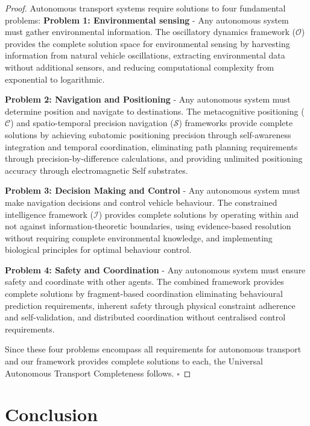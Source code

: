 \documentclass[12pt,a4paper]{article}
\begin{document}
\begin{proof}
Autonomous transport systems require solutions to four fundamental problems:
\textbf{Problem 1: Environmental sensing} - Any autonomous system must gather environmental information. The oscillatory dynamics framework ($\mathcal{O}$) provides the complete solution space for environmental sensing by harvesting information from natural vehicle oscillations, extracting environmental data without additional sensors, and reducing computational complexity from exponential to logarithmic.

\textbf{Problem 2: Navigation and Positioning} - Any autonomous system must determine position and navigate to destinations. The metacognitive positioning ($\mathcal{C}$) and spatio-temporal precision navigation ($\mathcal{S}$) frameworks provide complete solutions by achieving subatomic positioning precision through self-awareness integration and temporal coordination, eliminating path planning requirements through precision-by-difference calculations, and providing unlimited positioning accuracy through electromagnetic Self substrates.

\textbf{Problem 3: Decision Making and Control} - Any autonomous system must make navigation decisions and control vehicle behaviour. The constrained intelligence framework ($\mathcal{I}$) provides complete solutions by operating within and not against information-theoretic boundaries, using evidence-based resolution without requiring complete environmental knowledge, and implementing biological principles for optimal behaviour control.

\textbf{Problem 4: Safety and Coordination} - Any autonomous system must ensure safety and coordinate with other agents. The combined framework provides complete solutions by fragment-based coordination eliminating behavioural prediction requirements, inherent safety through physical constraint adherence and self-validation, and distributed coordination without centralised control requirements.

Since these four problems encompass all requirements for autonomous transport and our framework provides complete solutions to each, the Universal Autonomous Transport Completeness follows. $\square$
\end{proof}

\section{Conclusion}
\end{document}
